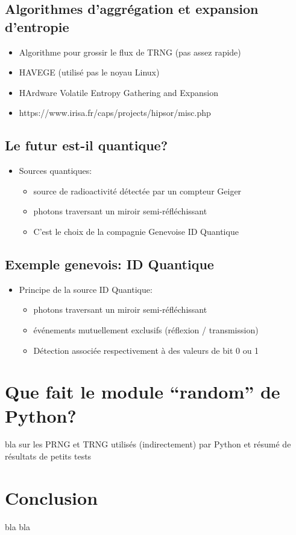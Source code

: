 \documentclass{scrartcl}
\begin{document}
\subsection{Algorithmes d'aggrégation et expansion d'entropie}
 \begin{itemize}
 \item Algorithme pour grossir le flux de TRNG (pas assez rapide)
 \item HAVEGE (utilisé pas le noyau Linux)
 \item HArdware Volatile Entropy Gathering and Expansion
 \item https://www.irisa.fr/caps/projects/hipsor/misc.php
 \end{itemize}

\subsection{Le futur est-il quantique?}
 \begin{itemize}
 \item Sources quantiques:
  \begin{itemize}
  \item source de radioactivité détectée par un compteur Geiger
  \item photons traversant un miroir semi-réfléchissant
  \item C’est le choix de la compagnie Genevoise ID Quantique
  \end{itemize}
 \end{itemize}

\subsection{Exemple genevois: ID Quantique}
 \begin{itemize}
 \item Principe de la source ID Quantique:
  \begin{itemize}
  \item photons traversant un miroir semi-réfléchissant
  \item événements mutuellement exclusifs (réflexion / transmission)
  \item Détection associée respectivement à des valeurs de bit 0 ou 1
  \end{itemize}
 \end{itemize}

\section{Que fait le module ``random'' de Python?}
bla sur les PRNG et TRNG utilisés (indirectement) par Python et résumé de
résultats de petits tests

\section{Conclusion}
bla bla

\printbibliography
\end{document}
